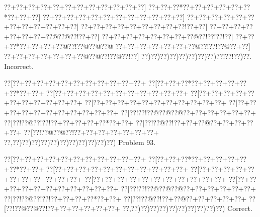 \documentclass[a5paper]{article}
\begin{document}
\begin{center}
{\goo
\0??+\0??+\0??+\0??+\0??+\0??+\0??+\0??+\0??+\0??+\0??+\0??]
\0??+\0??+\0??*\0??+\0??+\0??+\0??+\0??+\0??*\0??+\0??+\0??]
\0??+\0??+\0??+\0??+\0??+\0??+\0??+\0??+\0??+\0??+\0??+\0??]
\0??+\0??+\0??+\0??+\0??+\0??+\0??+\0??+\0??+\0??+\0??+\0??]
\0??+\0??+\0??+\0??+\0??+\0??+\0??+\0??+\0??!\0??+\0??]
\0??+\0??+\0??+\0??+\0??+\0??+\0??+\0??@\0??@\0??!\0??+\0??]
\0??+\0??+\0??+\0??+\0??+\0??+\0??+\0??@\0??!\0??!\0??!\0??]
\0??+\0??+\0??*\0??+\0??+\0??+\0??@\0??!\0??@\0??@\0??@
\0??+\0??+\0??+\0??+\0??+\0??+\0??@\0??!\0??!\0??@\0??+\0??]
\0??+\0??+\0??+\0??+\0??+\0??+\0??@\0??@\0??!\0??@\0??!\0??]
\0??)\0??)\0??)\0??)\0??)\0??)\0??)\0??)\0??!\0??!\0??)\0??.
}
Incorrect. 

\end{center}
\newpage
\begin{center}
{\goo
\0??[\0??+\0??+\0??+\0??+\0??+\0??+\0??+\0??+\0??+\0??+\0??+
\0??[\0??+\0??+\0??*\0??+\0??+\0??+\0??+\0??+\0??*\0??+\0??+
\0??[\0??+\0??+\0??+\0??+\0??+\0??+\0??+\0??+\0??+\0??+\0??+
\0??[\0??+\0??+\0??+\0??+\0??+\0??+\0??+\0??+\0??+\0??+\0??+
\0??[\0??+\0??+\0??+\0??+\0??+\0??+\0??+\0??+\0??+\0??+\0??+
\0??[\0??+\0??+\0??+\0??+\0??+\0??+\0??+\0??+\0??+\0??+\0??+
\0??[\0??!\0??!\0??@\0??@\0??@\0??+\0??+\0??+\0??+\0??+\0??+
\0??[\0??!\0??@\0??!\0??!\0??+\0??+\0??+\0??+\0??*\0??+\0??+
\0??[\0??!\0??@\0??!\0??+\0??+\0??@\0??+\0??+\0??+\0??+\0??+
\0??[\0??!\0??@\0??@\0??!\0??+\0??+\0??+\0??+\0??+\0??+\0??+
\0??,\0??)\0??)\0??)\0??)\0??)\0??)\0??)\0??)\0??)\0??)\0??)
}
Problem 93.

\end{center}
\begin{center}
{\goo
\0??[\0??+\0??+\0??+\0??+\0??+\0??+\0??+\0??+\0??+\0??+\0??+
\0??[\0??+\0??+\0??*\0??+\0??+\0??+\0??+\0??+\0??*\0??+\0??+
\0??[\0??+\0??+\0??+\0??+\0??+\0??+\0??+\0??+\0??+\0??+\0??+
\0??[\0??+\0??+\0??+\0??+\0??+\0??+\0??+\0??+\0??+\0??+\0??+
\0??[\0??+\0??+\0??+\0??+\0??+\0??+\0??+\0??+\0??+\0??+\0??+
\0??[\0??+\0??+\0??+\0??+\0??+\0??+\0??+\0??+\0??+\0??+\0??+
\0??[\0??!\0??!\0??@\0??@\0??@\0??+\0??+\0??+\0??+\0??+\0??+
\0??[\0??!\0??@\0??!\0??!\0??+\0??+\0??+\0??*\0??+\0??+
\0??[\0??!\0??@\0??!\0??+\0??@\0??+\0??+\0??+\0??+\0??+
\0??[\0??!\0??@\0??@\0??!\0??+\0??+\0??+\0??+\0??+\0??+
\0??,\0??)\0??)\0??)\0??)\0??)\0??)\0??)\0??)\0??)\0??)
}
Correct. 

\end{center}
\end{document}
